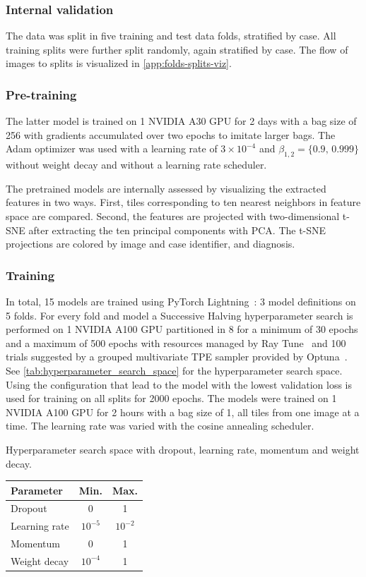 \subsubsection{Internal validation}
The data was split in five training and test data folds, stratified by case.
All training splits were further split randomly, again stratified by case.
The flow of images to splits is visualized in \cref{app:folds-splits-viz}.

\subsubsection{Pre-training}
The latter model is trained on 1 NVIDIA A30 GPU for 2 days with a bag size of 256 with gradients accumulated over two epochs to imitate larger bags.
The Adam optimizer was used with a learning rate of $3\times 10^{-4}$ and $\beta_{1,2} = \{0.9,\, 0.999\}$ without weight decay and without a learning rate scheduler.

The pretrained models are internally assessed by visualizing the extracted features in two ways.
First, tiles corresponding to ten nearest neighbors in feature space are compared.
Second, the features are projected with two-dimensional t-SNE after extracting the ten principal components with PCA.
The t-SNE projections are colored by image and case identifier, and diagnosis.

\subsubsection{Training}
In total, 15 models are trained using PyTorch Lightning~: 3 model definitions on 5 folds.
For every fold and model a Successive Halving hyperparameter search is performed on 1 NVIDIA A100 GPU partitioned in 8 for a minimum of 30 epochs and a maximum of 500 epochs with resources managed by Ray Tune~ and 100 trials suggested by a grouped multivariate TPE sampler provided by Optuna~.
See \cref{tab:hyperparameter_search_space} for the hyperparameter search space.
Using the configuration that lead to the model with the lowest validation loss is used for training on all splits for 2000 epochs.
The models were trained on 1 NVIDIA A100 GPU for 2 hours with a bag size of 1, \ie all tiles from one image at a time.
The learning rate was varied with the cosine annealing scheduler.

\begin{margintable}
    \caption[Hyperparameter search space]{
        Hyperparameter search space with dropout, learning rate, momentum and weight decay.
    }
    \label{tab:hyperparameter_search_space}
    \begin{tabular}{lcc}
        \toprule
        Parameter &  Min. & Max. \\
        \midrule
        Dropout & 0 & 1 \\
        Learning rate & $10^{-5}$ & $10^{-2}$ \\
        Momentum & 0 & 1 \\
        Weight decay & $10^{-4}$ & 1 \\
        \bottomrule
    \end{tabular}
\end{margintable}

